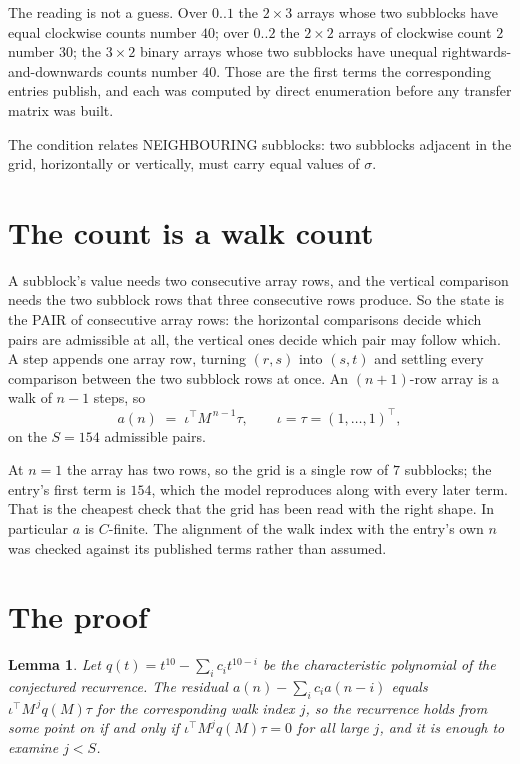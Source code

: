 \documentclass[11pt,a4paper]{article}
\theoremstyle{plain}
\newtheorem{lemma}[theorem]{Lemma}
\theoremstyle{definition}
\begin{document}
The reading is not a guess. Over $0..1$ the $2\times3$ arrays whose two subblocks have equal
clockwise counts number $40$; over $0..2$ the $2\times2$ arrays of clockwise count $2$ number
$30$; the $3\times2$ binary arrays whose two subblocks have unequal rightwards-and-downwards
counts number $40$. Those are the first terms the corresponding entries publish, and each was
computed by direct enumeration before any transfer matrix was built.

The condition relates NEIGHBOURING subblocks: two subblocks adjacent in the grid, horizontally
or vertically, must carry equal values of $\sigma$.

\section{The count is a walk count}

A subblock's value needs two consecutive array rows, and the vertical
comparison needs the two subblock rows that three consecutive rows produce. So the state is the
PAIR of consecutive array rows: the horizontal comparisons decide which pairs are admissible at
all, the vertical ones decide which pair may follow which. A step appends one array row,
turning $(r,s)$ into $(s,t)$ and settling every comparison between the two subblock rows at
once. An $(n+1)$-row array is a walk of $n-1$ steps, so
\[
a(n)\;=\;\iota^{\!\top}M^{\,n-1}\tau,\qquad\iota=\tau=(1,\dots,1)^{\!\top},
\]
on the $S=154$ admissible pairs.

At $n=1$ the array has two rows, so the grid is a single row of $7$
subblocks; the entry's first term is $154$, which the model
reproduces along with every later term. That is the cheapest check that the grid has been read
with the right shape.
In particular $a$ is $C$-finite. The alignment of the walk index with the entry's own $n$ was
checked against its published terms rather than assumed.

\section{The proof}

\begin{lemma}\label{lem:crit}
Let $q(t)=t^{10}-\sum_i c_it^{10-i}$ be the characteristic polynomial of the
conjectured recurrence. The residual $a(n)-\sum_ic_ia(n-i)$ equals
$\iota^{\!\top}M^{\,j}q(M)\tau$ for the corresponding walk index $j$, so the recurrence
holds from some point on if and only if $\iota^{\!\top}M^{j}q(M)\tau=0$ for all large $j$,
and it is enough to examine $j<S$.
\end{lemma}
\end{document}
